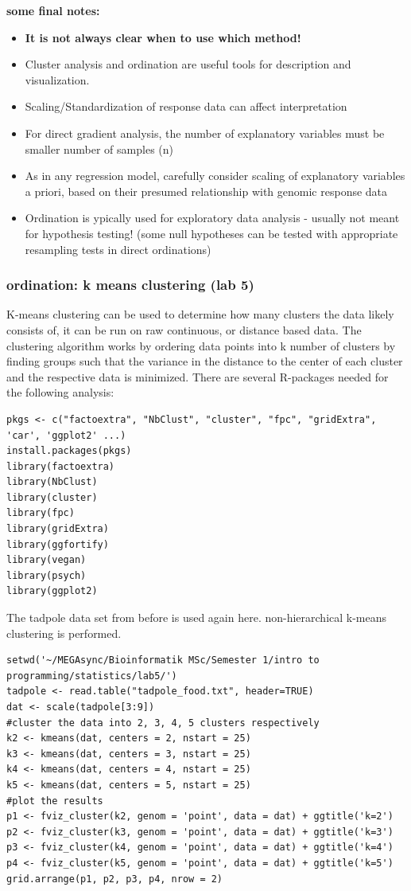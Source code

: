 \documentclass{article}
\begin{document}
\textbf{some final notes:}
\begin{itemize}
    \item \textbf{  It is not always clear when to use which method!}
    \item Cluster analysis and ordination are useful tools for description and visualization.
    \item Scaling/Standardization of response data can affect interpretation
    \item For direct gradient analysis, the number of explanatory variables must be smaller number of samples (n)
    \item As in any regression model, carefully consider scaling of explanatory variables a priori, based on their presumed relationship with genomic response data
    \item Ordination is ypically used for exploratory data analysis - usually not meant for hypothesis testing! (some null hypotheses can be tested with appropriate resampling tests in direct ordinations)
\end{itemize}


\subsubsection{ordination: k means clustering (lab 5)}
K-means clustering can be used to determine how many clusters the data likely consists of, it can be run on raw continuous, or distance based data. The clustering algorithm works by ordering data points into k number of clusters by finding groups such that the variance in the distance to the center of each cluster and the respective data is minimized. There are several R-packages needed for the following analysis:
\begin{lstlisting}
pkgs <- c("factoextra", "NbClust", "cluster", "fpc", "gridExtra", 'car', 'ggplot2' ...)
install.packages(pkgs)
library(factoextra)
library(NbClust)
library(cluster)
library(fpc)
library(gridExtra)
library(ggfortify)
library(vegan)
library(psych)
library(ggplot2)
\end{lstlisting}
The tadpole data set from before is used again here. non-hierarchical k-means clustering is performed.

\begin{lstlisting}
setwd('~/MEGAsync/Bioinformatik MSc/Semester 1/intro to programming/statistics/lab5/')
tadpole <- read.table("tadpole_food.txt", header=TRUE)
dat <- scale(tadpole[3:9])
#cluster the data into 2, 3, 4, 5 clusters respectively
k2 <- kmeans(dat, centers = 2, nstart = 25)
k3 <- kmeans(dat, centers = 3, nstart = 25)
k4 <- kmeans(dat, centers = 4, nstart = 25)
k5 <- kmeans(dat, centers = 5, nstart = 25)
#plot the results
p1 <- fviz_cluster(k2, genom = 'point', data = dat) + ggtitle('k=2')
p2 <- fviz_cluster(k3, genom = 'point', data = dat) + ggtitle('k=3')
p3 <- fviz_cluster(k4, genom = 'point', data = dat) + ggtitle('k=4')
p4 <- fviz_cluster(k5, genom = 'point', data = dat) + ggtitle('k=5')
grid.arrange(p1, p2, p3, p4, nrow = 2)
\end{lstlisting}
\end{document}
